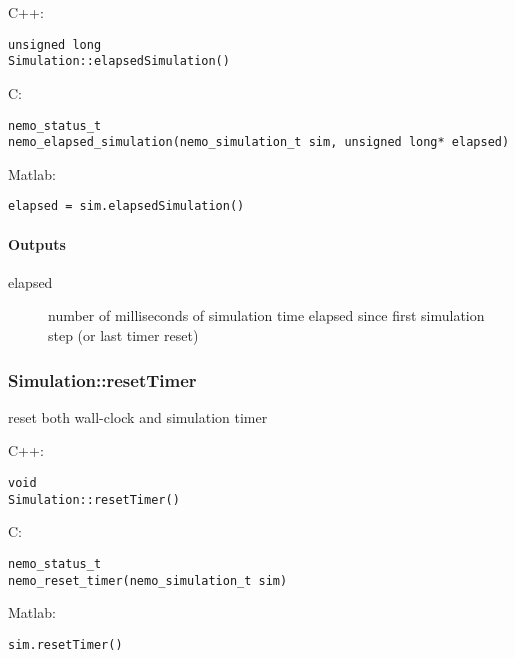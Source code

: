 \noindent C++:
\begin{lstlisting}[aboveskip=2pt]
unsigned long
Simulation::elapsedSimulation()
\end{lstlisting}

\noindent C:
\begin{lstlisting}[aboveskip=2pt]
nemo_status_t
nemo_elapsed_simulation(nemo_simulation_t sim, unsigned long* elapsed)
\end{lstlisting}

\noindent Matlab:
\begin{lstlisting}[aboveskip=2pt]
elapsed = sim.elapsedSimulation()
\end{lstlisting}
\paragraph{Outputs}
\begin{description}
\item[elapsed] number of milliseconds of simulation time elapsed since first simulation step (or last timer reset)
\end{description}

\clearpage
\subsubsection*{Simulation::resetTimer}
\label{fn: resetTimer}
reset both wall-clock and simulation timer


\noindent C++:
\begin{lstlisting}[aboveskip=2pt]
void
Simulation::resetTimer()
\end{lstlisting}

\noindent C:
\begin{lstlisting}[aboveskip=2pt]
nemo_status_t
nemo_reset_timer(nemo_simulation_t sim)
\end{lstlisting}

\noindent Matlab:
\begin{lstlisting}[aboveskip=2pt]
sim.resetTimer()
\end{lstlisting}

\clearpage